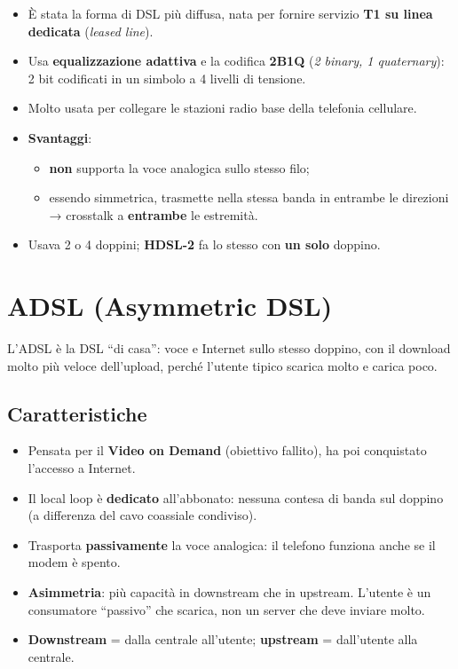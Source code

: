 \begin{itemize}
\tightlist
\item
  È stata la forma di DSL più diffusa, nata per fornire servizio \textbf{T1 su linea dedicata} (\emph{leased line}).
\item
  Usa \textbf{equalizzazione adattiva} e la codifica \textbf{2B1Q} (\emph{2 binary, 1 quaternary}): 2 bit codificati in un simbolo a 4 livelli di tensione.
\item
  Molto usata per collegare le stazioni radio base della telefonia cellulare.
\item
  \textbf{Svantaggi}:

  \begin{itemize}
  \tightlist
  \item
    \textbf{non} supporta la voce analogica sullo stesso filo;
  \item
    essendo simmetrica, trasmette nella stessa banda in entrambe le direzioni → crosstalk a \textbf{entrambe} le estremità.
  \end{itemize}
\item
  Usava 2 o 4 doppini; \textbf{HDSL-2} fa lo stesso con \textbf{un solo} doppino.
\end{itemize}

\section{ADSL (Asymmetric DSL)}

\begin{inbreve}

L'ADSL è la DSL ``di casa'': voce e Internet sullo stesso doppino, con il download molto più veloce dell'upload, perché l'utente tipico scarica molto e carica poco.

\end{inbreve}

\subsection{Caratteristiche}

\begin{itemize}
\tightlist
\item
  Pensata per il \textbf{Video on Demand} (obiettivo fallito), ha poi conquistato l'accesso a Internet.
\item
  Il local loop è \textbf{dedicato} all'abbonato: nessuna contesa di banda sul doppino (a differenza del cavo coassiale condiviso).
\item
  Trasporta \textbf{passivamente} la voce analogica: il telefono funziona anche se il modem è spento.
\item
  \textbf{Asimmetria}: più capacità in downstream che in upstream. L'utente è un consumatore ``passivo'' che scarica, non un server che deve inviare molto.
\item
  \textbf{Downstream} = dalla centrale all'utente; \textbf{upstream} = dall'utente alla centrale.
\end{itemize}

